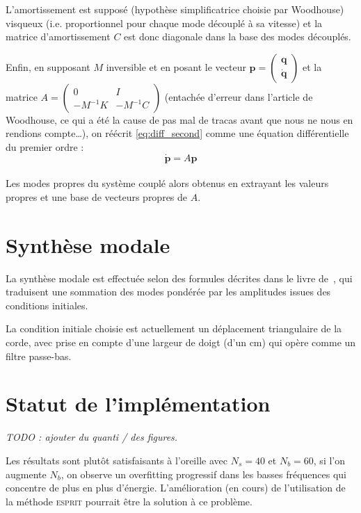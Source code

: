   L'amortissement est supposé (hypothèse simplificatrice choisie par Woodhouse)
visqueux (i.e. proportionnel pour chaque mode découplé à sa vitesse) et la
matrice d'amortissement \( C \) est donc diagonale dans la base des
modes découplés.

  Enfin, en supposant \( M \) inversible et en posant le vecteur
\( \bm{p} = \begin{pmatrix} \bm{q} \\ \bm{\dot{q}} \end{pmatrix} \) et la
matrice \( A = \begin{pmatrix} 0 & I \\ -M^{-1}K & -M^{-1}C \end{pmatrix} \)
(entachée d'erreur dans l'article de Woodhouse, ce qui a été la cause de pas
mal de tracas avant que nous ne nous en rendions compte\dots), on réécrit
\ref{eq:diff_second} comme une équation différentielle du premier ordre :
\[ \bm{\dot{p}} = A\bm{p} \]

\paragraph{}
  Les modes propres du système couplé alors obtenus en extrayant les valeurs
propres et une base de vecteurs propres de \( A \).

\section{Synthèse modale}

  La synthèse modale est effectuée selon des formules décrites
dans le livre de~\textcite{newland}, qui traduisent une sommation des modes
pondérée par les amplitudes issues des conditions initiales.

  La condition initiale choisie est actuellement un déplacement triangulaire
de la corde, avec prise en compte d'une largeur de doigt (d'un \( \si{\cm} \))
qui opère comme un filtre passe-bas.

\section{Statut de l'implémentation}

  \emph{TODO : ajouter du quanti / des figures.}
  
  Les résultats sont plutôt satisfaisants à l'oreille avec \( N_s = 40 \) et
\( N_b = 60 \), si l'on augmente \( N_b \), on observe un overfitting
progressif dans les basses fréquences qui concentre de plus en plus d'énergie.
L'amélioration (en cours) de l'utilisation de la méthode \textsc{esprit}
pourrait être la solution à ce problème.

